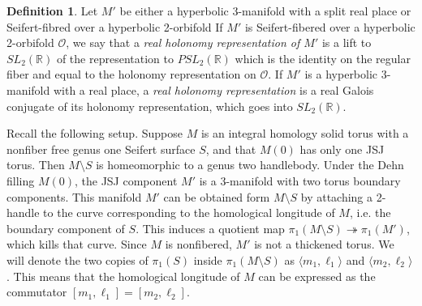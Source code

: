 \documentclass{article}
\theoremstyle{plain}
\theoremstyle{definition}
\newtheorem{definition}[theorem]{Definition}
\theoremstyle{plain}
\theoremstyle{plain}
\theoremstyle{plain}
\theoremstyle{remark}
\theoremstyle{remark}
\theoremstyle{plain}
\theoremstyle{plain}
\begin{document}
\begin{definition}
Let $M'$ be either a hyperbolic 3-manifold with a split real place or Seifert-fibred over a hyperbolic 2-orbifold  If $M'$ is Seifert-fibered over a hyperbolic 2-orbifold $\mathcal{O}$, we say that a \emph{real holonomy representation of $M'$} is a lift to $SL_2(\mathbb{R})$ of the representation to $PSL_2(\mathbb{R})$ which is the identity on the regular fiber and equal to the holonomy representation on $\mathcal{O}$. If $M'$ is a hyperbolic 3-manifold with a real place, a \emph{real holonomy representation} is a real Galois conjugate of its holonomy representation, which goes into $SL_2(\mathbb{R})$.
\end{definition}

Recall the following setup. Suppose $M$ is an integral homology solid torus with a nonfiber free genus one Seifert surface $S$, and that $M(0)$ has only one JSJ torus. Then $M \setminus S$ is homeomorphic to a genus two handlebody. Under the Dehn filling $M(0)$, the JSJ component $M'$ is a 3-manifold with two torus boundary components. This manifold $M'$ can be obtained form $M \setminus S$ by attaching a 2-handle to the curve corresponding to the homological longitude of $M$, i.e. the boundary component of $S$. This induces a quotient map $\pi_1(M \setminus S) \twoheadrightarrow \pi_1(M')$, which kills that curve. Since $M$ is nonfibered, $M'$ is not a thickened torus. We will denote the two copies of $\pi_1(S)$ inside $\pi_1(M \setminus S)$ as $\langle m_1, \ell_1 \rangle$ and $\langle m_2, \ell_2 \rangle$. This means that the homological longitude of $M$ can be expressed as the commutator $[m_1, \ell_1] = [m_2, \ell_2]$. 
\end{document}
